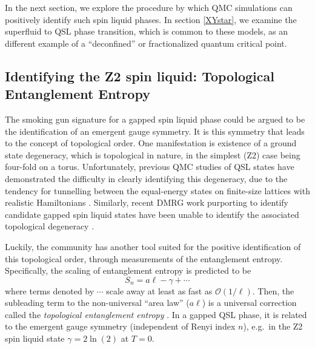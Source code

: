 \documentclass[range]{ar2e}
\begin{document}

In the next section, we explore the procedure by which QMC simulations can positively identify such spin liquid phases.  In section \ref{XYstar}, we examine the superfluid to QSL phase transition, which is common to these models, as an different example of a ``deconfined'' or fractionalized quantum critical point.

\subsection{Identifying the Z2 spin liquid: Topological Entanglement Entropy}

The smoking gun signature for a gapped spin liquid phase could be argued to be the identification of an emergent gauge symmetry.  It is this symmetry that leads to the concept of topological order.  One manifestation is existence of a ground state degeneracy, which is topological in nature, in the simplest (Z2) case being four-fold on a torus.  Unfortunately, previous QMC studies of QSL states have demonstrated the difficulty in clearly identifying this degeneracy, due to the tendency for tunnelling between the equal-energy states on finite-size lattices with realistic Hamiltonians \cite{Isakov1}.  Similarly, recent DMRG work purporting to identify candidate gapped spin liquid states have been unable to identify the associated topological degeneracy \cite{Yan,J1J2}.

Luckily, the community has another tool suited for the positive identification of this topological order, through measurements of the entanglement entropy.  Specifically, the scaling of entanglement entropy is predicted to be
\begin{equation}
S_n = a \ell - \gamma + \cdots \label{areaL}
\end{equation}
where terms denoted by $\cdots$ scale away at least as fast as $\mathcal{O} (1/\ell)$.  Then, the subleading term to the non-universal ``area law'' ($a \ell$) is a universal correction called the {\it topological entanglement entropy} \cite{Alioscia1,Alioscia2,LW,KP}.  In a gapped QSL phase, it is related to the emergent gauge symmetry (independent \cite{Flammia} of Renyi index $n$), e.g.~in the Z2 spin liquid state $\gamma = 2 \ln(2)$ at $T=0$.
\end{document}
